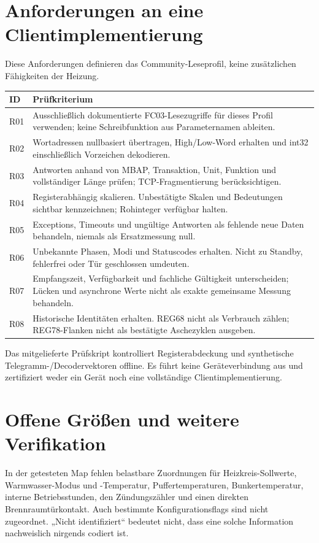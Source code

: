 \documentclass[10pt,a4paper]{article}
\begin{document}
\section{Anforderungen an eine Clientimplementierung}
Diese Anforderungen definieren das Community-Leseprofil, keine zusätzlichen Fähigkeiten der Heizung.
\begin{longtable}{@{}L{13mm}L{151mm}@{}}
\toprule\textbf{ID}&\textbf{Prüfkriterium}\\\midrule\endhead
R01 & Ausschließlich dokumentierte FC03-Lesezugriffe für dieses Profil verwenden; keine Schreibfunktion aus Parameternamen ableiten.\\
R02 & Wortadressen nullbasiert übertragen, High/Low-Word erhalten und int32 einschließlich Vorzeichen dekodieren.\\
R03 & Antworten anhand von MBAP, Transaktion, Unit, Funktion und vollständiger Länge prüfen; TCP-Fragmentierung berücksichtigen.\\
R04 & Registerabhängig skalieren. Unbestätigte Skalen und Bedeutungen sichtbar kennzeichnen; Rohinteger verfügbar halten.\\
R05 & Exceptions, Timeouts und ungültige Antworten als fehlende neue Daten behandeln, niemals als Ersatzmessung null.\\
R06 & Unbekannte Phasen, Modi und Statuscodes erhalten. Nicht zu Standby, fehlerfrei oder Tür geschlossen umdeuten.\\
R07 & Empfangszeit, Verfügbarkeit und fachliche Gültigkeit unterscheiden; Lücken und asynchrone Werte nicht als exakte gemeinsame Messung behandeln.\\
R08 & Historische Identitäten erhalten. REG68 nicht als Verbrauch zählen; REG78-Flanken nicht als bestätigte Aschezyklen ausgeben.\\\bottomrule
\end{longtable}
Das mitgelieferte Prüfskript kontrolliert Registerabdeckung und synthetische Telegramm-/Decodervektoren offline. Es führt keine Geräteverbindung aus und zertifiziert weder ein Gerät noch eine vollständige Clientimplementierung.

\section{Offene Größen und weitere Verifikation}
In der getesteten Map fehlen belastbare Zuordnungen für Heizkreis-Sollwerte, Warmwasser-Modus und -Temperatur, Puffertemperaturen, Bunkertemperatur, interne Betriebsstunden, den Zündungszähler und einen direkten Brennraumtürkontakt. Auch bestimmte Konfigurationsflags sind nicht zugeordnet. „Nicht identifiziert“ bedeutet nicht, dass eine solche Information nachweislich nirgends codiert ist.
\end{document}
